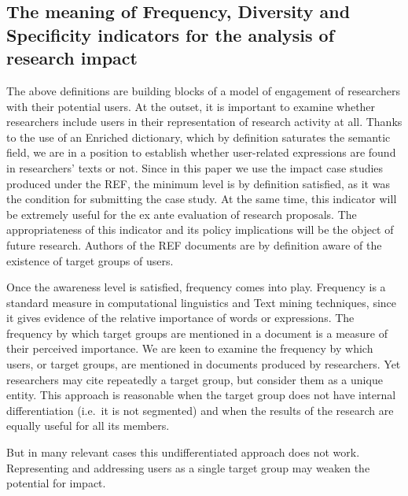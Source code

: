 \documentclass[]{book}
\begin{document}
\subsection{The meaning of Frequency, Diversity and Specificity
indicators for the analysis of research
impact}\label{the-meaning-of-frequency-diversity-and-specificity-indicators-for-the-analysis-of-research-impact}

The above definitions are building blocks of a model of engagement of
researchers with their potential users. At the outset, it is important
to examine whether researchers include users in their representation of
research activity at all. Thanks to the use of an Enriched dictionary,
which by definition saturates the semantic field, we are in a position
to establish whether user-related expressions are found in researchers'
texts or not. Since in this paper we use the impact case studies
produced under the REF, the minimum level is by definition satisfied, as
it was the condition for submitting the case study. At the same time,
this indicator will be extremely useful for the ex ante evaluation of
research proposals. The appropriateness of this indicator and its policy
implications will be the object of future research. Authors of the REF
documents are by definition aware of the existence of target groups of
users.

Once the awareness level is satisfied, frequency comes into play.
Frequency is a standard measure in computational linguistics and Text
mining techniques, since it gives evidence of the relative importance of
words or expressions. The frequency by which target groups are mentioned
in a document is a measure of their perceived importance. We are keen to
examine the frequency by which users, or target groups, are mentioned in
documents produced by researchers. Yet researchers may cite repeatedly a
target group, but consider them as a unique entity. This approach is
reasonable when the target group does not have internal differentiation
(i.e.~it is not segmented) and when the results of the research are
equally useful for all its members.

But in many relevant cases this undifferentiated approach does not work.
Representing and addressing users as a single target group may weaken
the potential for impact.
\end{document}
